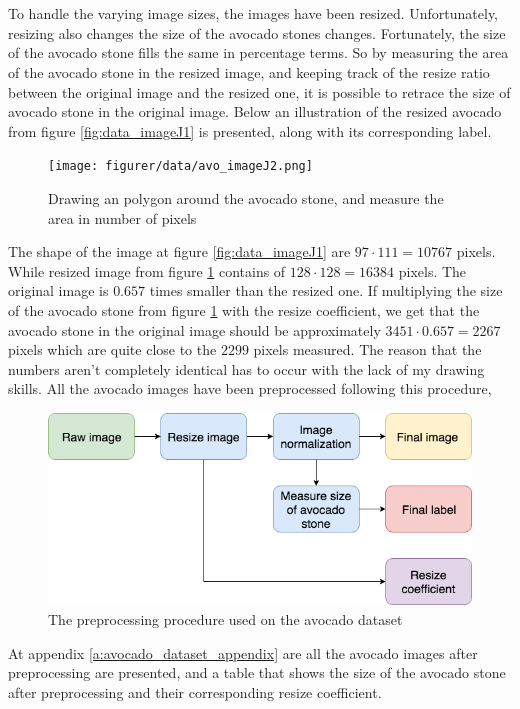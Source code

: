 \documentclass[11pt]{article}
\begin{document}
\\ \\
To handle the varying image sizes, the images have been resized. Unfortunately, resizing also changes the size of the avocado stones changes. Fortunately, the size of the avocado stone fills the same in percentage terms. So by measuring the area of the avocado stone in the resized image, and keeping track of the resize ratio between the original image and the resized one, it is possible to retrace the size of avocado stone in the original image. Below an illustration of the resized avocado from figure \ref{fig:data_imageJ1} is presented, along with its corresponding label.
\begin{figure}[!h]
    \centering
    \texttt{[image: figurer/data/avo\_imageJ2.png]}
    \caption{Drawing an polygon around the avocado stone, and measure the area in number of pixels}
    \label{fig:data_imageJ2}
\end{figure}
The shape of the image at figure \ref{fig:data_imageJ1} are $97 \cdot 111 = 10767$ pixels. While resized image from figure \ref{fig:data_imageJ2} contains of $128 \cdot 128 = 16384$ pixels. The original image is $0.657$ times smaller than the resized one. If multiplying the size of the avocado stone from figure \ref{fig:data_imageJ2} with the resize coefficient, we get that the avocado stone in the original image should be approximately $3451 \cdot 0.657 = 2267$ pixels which are quite close to the $2299$ pixels measured. The reason that the numbers aren't completely identical has to occur with the lack of my drawing skills. All the avocado images have been preprocessed following this procedure,
\begin{figure}[!h]\label{fig:imageJ2}
    \centering
    \includegraphics[scale=0.5]{figurer/data/preproces_avo_2.png}
    \caption{The preprocessing procedure used on the avocado dataset}
\end{figure}

At appendix \ref{a:avocado_dataset_appendix} are all the avocado images after preprocessing are presented, and a table that shows the size of the avocado stone after preprocessing and their corresponding resize coefficient. 
\end{document}
